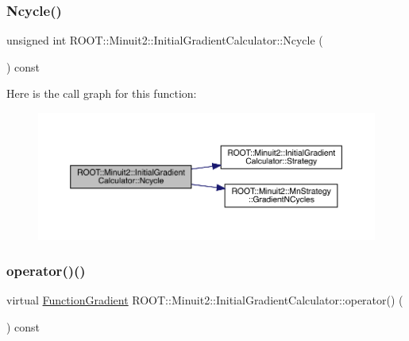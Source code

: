 \mbox{\label{classROOT_1_1Minuit2_1_1InitialGradientCalculator_aef8f53869854439865a45497e011a41c}} 
\subsubsection{\texorpdfstring{Ncycle()}{Ncycle()}\hspace{0.1cm}{\footnotesize\ttfamily [2/2]}}
{\footnotesize\ttfamily unsigned int R\+O\+O\+T\+::\+Minuit2\+::\+Initial\+Gradient\+Calculator\+::\+Ncycle (\begin{DoxyParamCaption}{ }\end{DoxyParamCaption}) const}

Here is the call graph for this function\+:\nopagebreak
\begin{figure}[H]
\begin{center}
\leavevmode
\includegraphics[width=350pt]{d3/dcf/classROOT_1_1Minuit2_1_1InitialGradientCalculator_aef8f53869854439865a45497e011a41c_cgraph}
\end{center}
\end{figure}
\mbox{\label{classROOT_1_1Minuit2_1_1InitialGradientCalculator_ae3f248b2e9e40bc62ee7dc68c8ee010f}} 
\subsubsection{\texorpdfstring{operator()()}{operator()()}\hspace{0.1cm}{\footnotesize\ttfamily [1/4]}}
{\footnotesize\ttfamily virtual \mbox{\hyperlink{classROOT_1_1Minuit2_1_1FunctionGradient}{Function\+Gradient}} R\+O\+O\+T\+::\+Minuit2\+::\+Initial\+Gradient\+Calculator\+::operator() (\begin{DoxyParamCaption}\item[{const \mbox{\hyperlink{classROOT_1_1Minuit2_1_1MinimumParameters}{Minimum\+Parameters}} \&}]{ }\end{DoxyParamCaption}) const\hspace{0.3cm}{\ttfamily [virtual]}}



